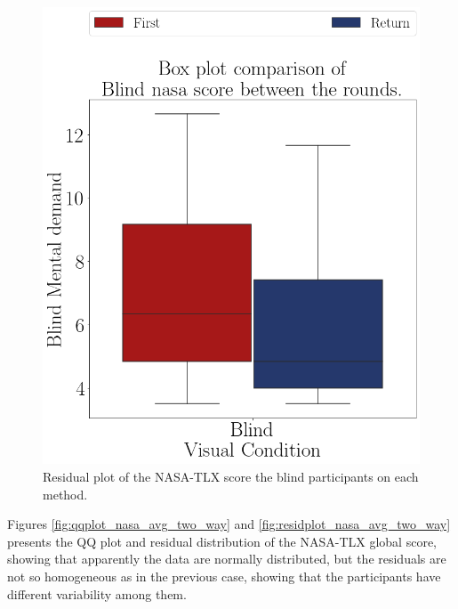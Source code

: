 \begin{figure}[!htb]
\begin{minipage}{0.45\textwidth}
        \includegraphics[width = 0.8\linewidth]{Resultados/Nasa/Figuras/png/boxplot_nasa_blind_rounds.png}
        \caption{Residual plot of the NASA-TLX score the blind participants on each method.}
        \label{fig:boxplot_nasa_blind_rounds}
    \end{minipage}
\end{figure}

%
%

Figures \ref{fig:qqplot_nasa_avg_two_way} and \ref{fig:residplot_nasa_avg_two_way} presents the QQ plot and residual distribution of the NASA-TLX global score, showing that apparently the data are normally distributed, but the residuals are not so homogeneous as in the previous case, showing that the participants have different variability among them.


